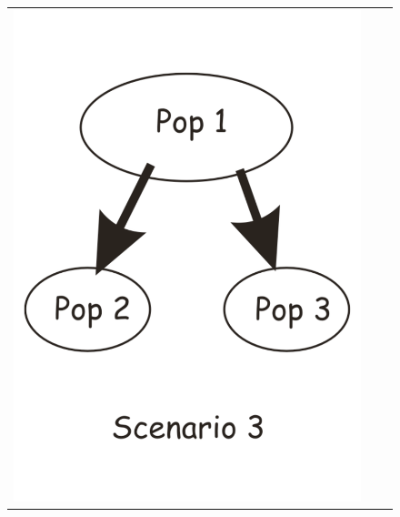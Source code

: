 \begin{figure}[h]
\begin{center}
\begin{tabular}{ccc}
\includegraphics[scale=0.2]{scenario_invasion_3.pdf}
\end{tabular}
\end{center}
\end{figure}

